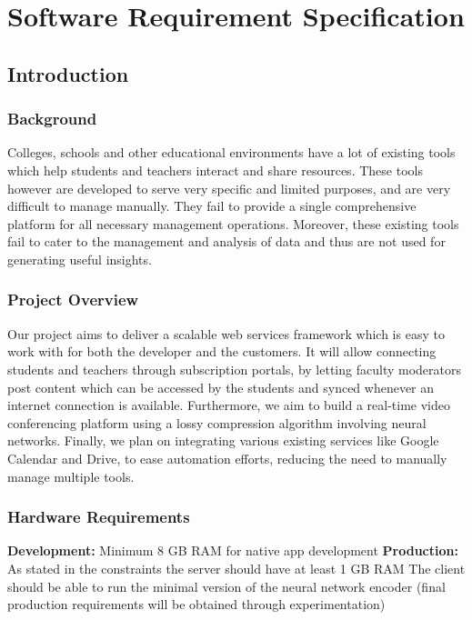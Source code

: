 \chapter{Software Requirement Specification}

\section{Introduction}

\subsection{Background}

Colleges, schools and other educational environments have a lot of existing tools 
which help students and teachers interact and share resources.
These tools however are developed to serve very specific and limited purposes, and are very difficult to 
manage manually. They fail to provide a single comprehensive platform for all 
necessary management operations. Moreover, these existing tools fail to cater to the 
management and analysis of data and thus are not used for generating useful 
insights.

\subsection{Project Overview}

Our project aims to deliver a scalable web services framework which is easy to work 
with for both the developer and the customers. It will allow connecting students and 
teachers through subscription portals, by letting faculty moderators post content 
which can be accessed by the students and synced whenever an internet connection 
is available. Furthermore, we aim to build a real-time video conferencing platform 
using a lossy compression algorithm involving neural networks. Finally, we plan on 
integrating various existing services like Google Calendar and Drive, to ease 
automation efforts, reducing the need to manually manage multiple tools.

\subsection{Hardware Requirements}

\textbf{Development:} 
Minimum 8 GB RAM for native app development
\textbf{Production:} 
As stated in the constraints the server should have at least 1 GB RAM  
The client should be able to run the minimal version of the neural network encoder 
(final production requirements will be obtained through experimentation)

